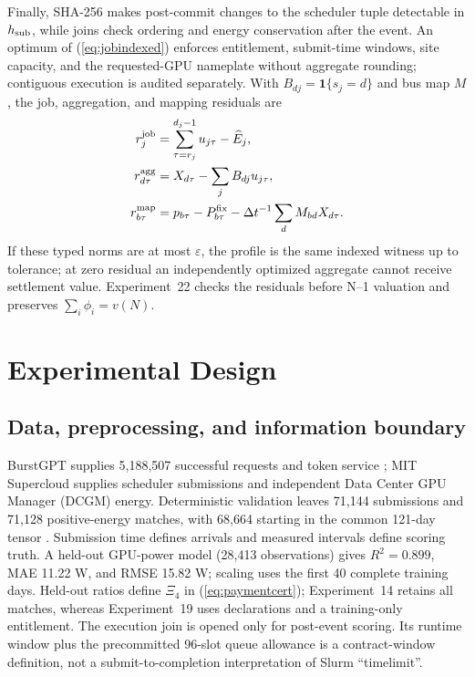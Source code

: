 \documentclass[10pt,journal]{IEEEtran}
\newcommand{\dt}{\Delta t}
\begin{document}
Finally, SHA-256 makes post-commit changes to the scheduler tuple detectable in
$h_{\rm sub}$, while joins check ordering and energy conservation after the event.
An optimum of (\ref{eq:jobindexed}) enforces entitlement, submit-time windows,
site capacity, and the requested-GPU nameplate without aggregate rounding;
contiguous execution is audited separately.
With $B_{dj}=\mathbf1\{s_j=d\}$ and bus map $M$, the job, aggregation, and
mapping residuals are
\begin{align*}
r^{\rm job}_j&=\sum_{\tau=r_j}^{d_j-1}u_{j\tau}-\widehat E_j,\\
r^{\rm agg}_{d\tau}&=X_{d\tau}-\sum_jB_{dj}u_{j\tau},\\
r^{\rm map}_{b\tau}&=p_{b\tau}-P^{\rm fix}_{b\tau}-\dt^{-1}\sum_dM_{bd}X_{d\tau}.
\end{align*}
If these typed norms are at most $\varepsilon$, the profile is the same indexed
witness up to tolerance; at zero residual an independently optimized aggregate
cannot receive settlement value. Experiment~22 checks the residuals before
N--1 valuation and preserves $\sum_i\phi_i=v(N)$.

\section{Experimental Design}\label{sec:design}

\subsection{Data, preprocessing, and information boundary}

BurstGPT supplies 5,188,507 successful requests and token service
\cite{wang2024burstgpt}; MIT Supercloud supplies scheduler submissions and
independent Data Center GPU Manager (DCGM) energy. Deterministic validation
leaves 71,144 submissions and 71,128 positive-energy matches, with 68,664
starting in the common 121-day tensor \cite{samsi2021supercloud}. Submission
time defines arrivals and measured intervals define scoring truth. A held-out
GPU-power model (28,413 observations) gives $R^2=0.899$, MAE 11.22 W, and RMSE
15.82 W; scaling uses the first 40 complete training days. Held-out ratios
define $\Xi_4$ in (\ref{eq:paymentcert}); Experiment~14 retains all matches,
whereas Experiment~19 uses declarations and a training-only entitlement. The
execution join is opened only for post-event scoring. Its runtime window
plus the precommitted 96-slot queue allowance is a contract-window definition,
not a submit-to-completion interpretation of Slurm ``timelimit''.
\end{document}
